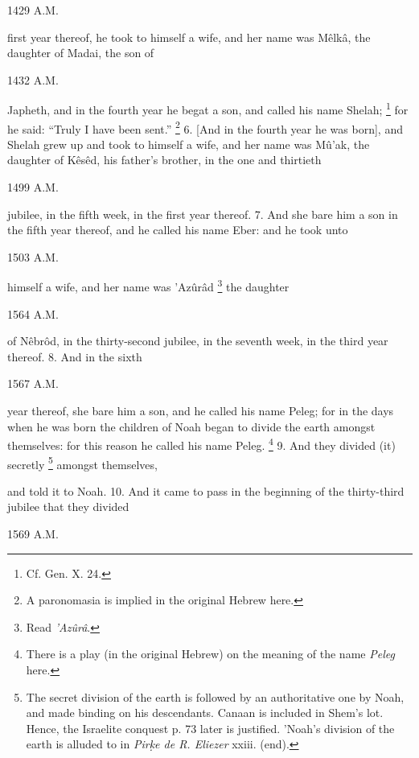 1429 A.M.

first year thereof, he took to himself a wife, and her name was Mêlkâ, the daughter of Madai, the son of

1432 A.M.

Japheth, and in the fourth year he begat a son, and called his name Shelah; \footnote{Cf. Gen. X. 24.} for he said: ``Truly I have been sent.'' \footnote{A paronomasia is implied in the original Hebrew here.} 6. [And in the fourth year he was born], and Shelah grew up and took to himself a wife, and her name was Mû’ak, the daughter of Kêsêd, his father's brother, in the one and thirtieth

1499 A.M.

jubilee, in the fifth week, in the first year thereof. 7. And she bare him a son in the fifth year thereof, and he called his name Eber: and he took unto

1503 A.M.

himself a wife, and her name was ’Azûrâd \footnote{Read \emph{’Azûrâ}.} the daughter

1564 A.M.

of Nêbrôd, in the thirty-second jubilee, in the seventh week, in the third year thereof. 8. And in the sixth

1567 A.M.

year thereof, she bare him a son, and he called his name Peleg; for in the days when he was born the children of Noah began to divide the earth amongst themselves: for this reason he called his name Peleg. \footnote{There is a play (in the original Hebrew) on the meaning of the name \emph{Peleg} here.} 9. And they divided (it) secretly \footnote{The secret division of the earth is followed by an authoritative one by Noah, and made binding on his descendants. Canaan is included in Shem's lot. Hence, the Israelite conquest p. 73 later is justified. 'Noah's division of the earth is alluded to in \emph{Pir\d{k}e de R. Eliezer} xxiii. (end).} amongst themselves,

and told it to Noah. 10. And it came to pass in the beginning of the thirty-third jubilee that they divided

1569 A.M.

